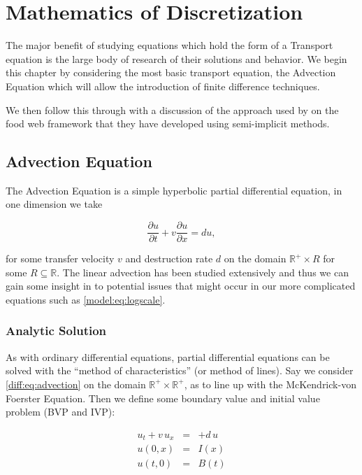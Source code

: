 \documentclass[../main.tex]{subfiles}
\begin{document}
  \chapter{Mathematics of Discretization}\label{chapter:fdes}
  The major benefit of studying equations which hold the form of a Transport equation is the large body of research of their solutions and behavior. We begin this chapter by considering the most basic transport equation, the Advection Equation which will allow the introduction of finite difference techniques.

  We then follow this through with a discussion of the approach used by \cite{hartvig2011} on the food web framework that they have developed using semi-implicit methods.

  \section{Advection Equation}
  The Advection Equation is a simple hyperbolic partial differential equation, in one dimension we take

  \begin{equation} \label{diff:eq:advection}
    \frac{\partial u}{\partial t} + v \frac{\partial u}{\partial x} = d u,
  \end{equation}

  for some transfer velocity $v$ and destruction rate $d$ on the domain $\mathbb{R}^+ \times R$ for some $R \subseteq \mathbb{R}$. The linear advection has been studied extensively and thus we can gain some insight in to potential issues that might occur in our more complicated equations such as \autoref{model:eq:logscale}.

  \subsection{Analytic Solution}
  As with ordinary differential equations, partial differential equations can be solved with the ``method of characteristics'' (or method of lines). Say we consider \autoref{diff:eq:advection} on the domain $\mathbb{R}^+ \times \mathbb{R}^+$, as to line up with the McKendrick-von Foerster Equation. Then we define some boundary value and initial value problem (BVP and IVP):

  \begin{eqnarray} \label{diff:eq:advectionbvp}
    u_t + v \, u_x  &=& + d \, u \nonumber \\
    u(0, x) &=& I(x) \nonumber \\
    u(t, 0) &=& B(t)
  \end{eqnarray}
\end{document}

